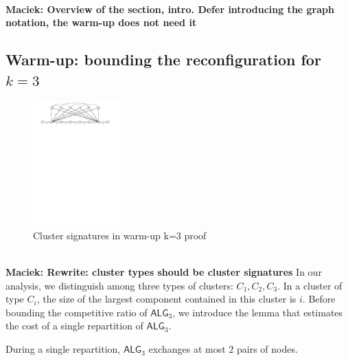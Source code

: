 \documentclass[manuscript,screen=true, review, anonymous]{acmart}
\newcommand{\TAlg}{{\ensuremath{\textsf{ALG}_{3}}}\xspace}
\newcommand\maciek[1]{\color{brown}\textbf{\\ Maciek: #1}\color{black}}
\begin{document}
\maciek{Overview of the section, intro. Defer introducing the graph notation, the warm-up does not need it}

\subsection{Warm-up: bounding the reconfiguration for $k=3$}


\begin{figure}[H]
	\centering
	\includegraphics[width=0.3\textwidth]{figs/substitute}
	\caption{Cluster signatures in warm-up k=3 proof}
\end{figure}

\maciek{Rewrite: cluster types should be cluster signatures}
In our analysis, we distinguish among three types of clusters: $C_1, C_2, C_3$. In a cluster of type $C_i$, the size of the largest component contained in this cluster is $i$.
Before bounding the competitive ratio of \TAlg, we introduce the lemma that estimates the cost of a single repartition of \TAlg.

\begin{lemma}
	\label{lem:1req}
	During a single repartition, \TAlg exchanges at most $2$ pairs of nodes.
\end{lemma}
\end{document}
